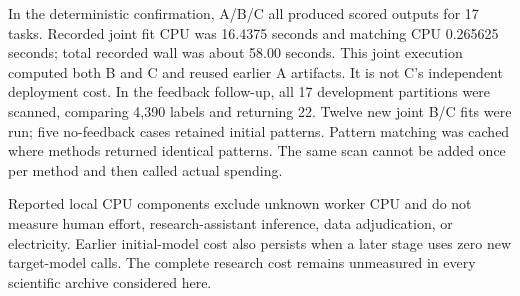 \documentclass[10pt,twocolumn,letterpaper]{article}
\begin{document}
In the deterministic confirmation, A/B/C all produced scored outputs for 17 tasks. Recorded joint fit CPU was 16.4375 seconds and matching CPU 0.265625 seconds; total recorded wall was about 58.00 seconds. This joint execution computed both B and C and reused earlier A artifacts. It is not C's independent deployment cost. In the feedback follow-up, all 17 development partitions were scanned, comparing 4,390 labels and returning 22. Twelve new joint B/C fits were run; five no-feedback cases retained initial patterns. Pattern matching was cached where methods returned identical patterns. The same scan cannot be added once per method and then called actual spending.

Reported local CPU components exclude unknown worker CPU and do not measure human effort, research-assistant inference, data adjudication, or electricity. Earlier initial-model cost also persists when a later stage uses zero new target-model calls. The complete research cost remains unmeasured in every scientific archive considered here.
\end{document}
